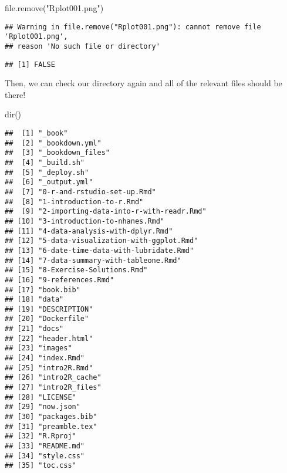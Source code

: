 \documentclass[
]{book}
\newenvironment{Shaded}{\begin{snugshade}}{\end{snugshade}}
\newcommand{\FunctionTok}[1]{\textcolor[rgb]{0.00,0.00,0.00}{#1}}
\newcommand{\NormalTok}[1]{#1}
\newcommand{\StringTok}[1]{\textcolor[rgb]{0.31,0.60,0.02}{#1}}
\begin{document}
\begin{Shaded}
\begin{Highlighting}[]
\FunctionTok{file.remove}\NormalTok{(}\StringTok{"Rplot001.png"}\NormalTok{)}
\end{Highlighting}
\end{Shaded}

\begin{verbatim}
## Warning in file.remove("Rplot001.png"): cannot remove file 'Rplot001.png',
## reason 'No such file or directory'
\end{verbatim}

\begin{verbatim}
## [1] FALSE
\end{verbatim}

Then, we can check our directory again and all of the relevant files should be there!

\begin{Shaded}
\begin{Highlighting}[]
\FunctionTok{dir}\NormalTok{()}
\end{Highlighting}
\end{Shaded}

\begin{verbatim}
##  [1] "_book"                                 
##  [2] "_bookdown.yml"                         
##  [3] "_bookdown_files"                       
##  [4] "_build.sh"                             
##  [5] "_deploy.sh"                            
##  [6] "_output.yml"                           
##  [7] "0-r-and-rstudio-set-up.Rmd"            
##  [8] "1-introduction-to-r.Rmd"               
##  [9] "2-importing-data-into-r-with-readr.Rmd"
## [10] "3-introduction-to-nhanes.Rmd"          
## [11] "4-data-analysis-with-dplyr.Rmd"        
## [12] "5-data-visualization-with-ggplot.Rmd"  
## [13] "6-date-time-data-with-lubridate.Rmd"   
## [14] "7-data-summary-with-tableone.Rmd"      
## [15] "8-Exercise-Solutions.Rmd"              
## [16] "9-references.Rmd"                      
## [17] "book.bib"                              
## [18] "data"                                  
## [19] "DESCRIPTION"                           
## [20] "Dockerfile"                            
## [21] "docs"                                  
## [22] "header.html"                           
## [23] "images"                                
## [24] "index.Rmd"                             
## [25] "intro2R.Rmd"                           
## [26] "intro2R_cache"                         
## [27] "intro2R_files"                         
## [28] "LICENSE"                               
## [29] "now.json"                              
## [30] "packages.bib"                          
## [31] "preamble.tex"                          
## [32] "R.Rproj"                               
## [33] "README.md"                             
## [34] "style.css"                             
## [35] "toc.css"
\end{verbatim}
\end{document}
